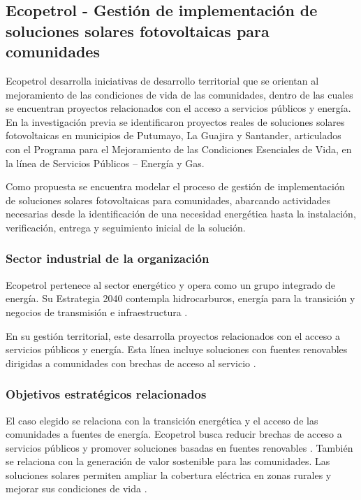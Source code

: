 \subsection{Ecopetrol - Gestión de implementación de soluciones solares fotovoltaicas para comunidades}

Ecopetrol desarrolla iniciativas de desarrollo territorial que se orientan al mejoramiento de las condiciones de vida de las comunidades, dentro de las cuales se encuentran proyectos relacionados con el acceso a servicios públicos y energía. En la investigación previa se identificaron proyectos reales de soluciones solares fotovoltaicas en municipios de Putumayo, La Guajira y Santander, articulados con el Programa para el Mejoramiento de las Condiciones Esenciales de Vida, en la línea de Servicios Públicos – Energía y Gas.

Como propuesta se encuentra modelar el proceso de gestión de implementación de soluciones solares fotovoltaicas para comunidades, abarcando actividades necesarias desde la identificación de una necesidad energética hasta la instalación, verificación, entrega y seguimiento inicial de la solución.

\subsubsection*{Sector industrial de la organización}

Ecopetrol pertenece al sector energético y opera como un grupo integrado de energía. Su Estrategia 2040 contempla hidrocarburos, energía para la transición y negocios de transmisión e infraestructura \parencite{ecopetrolEstrategia2040}.

En su gestión territorial, este desarrolla proyectos relacionados con el acceso a servicios públicos y energía. Esta línea incluye soluciones con fuentes renovables dirigidas a comunidades con brechas de acceso al servicio \parencite{ecopetrolEntorno}.

\subsubsection*{Objetivos estratégicos relacionados}

El caso elegido se relaciona con la transición energética y el acceso de las comunidades a fuentes de energía. Ecopetrol busca reducir brechas de acceso a servicios públicos y promover soluciones basadas en fuentes renovables \parencite{ecopetrolEntorno}. También se relaciona con la generación de valor sostenible para las comunidades. Las soluciones solares permiten ampliar la cobertura eléctrica en zonas rurales y mejorar sus condiciones de vida \parencite{ecopetrolEntorno}.

